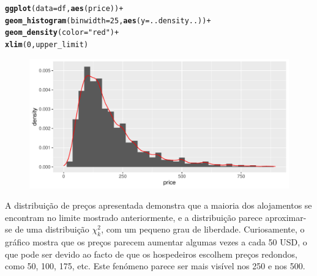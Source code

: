 \documentclass[justified, 11pt]{scrartcl}\usepackage[]{graphicx}\usepackage[]{xcolor}
\makeatletter
\def\maxwidth{ %
  \ifdim\Gin@nat@width>\linewidth
    \linewidth
  \else
    \Gin@nat@width
  \fi
}
\newcommand{\hlnum}[1]{\textcolor[rgb]{0.686,0.059,0.569}{#1}}%
\newcommand{\hlstr}[1]{\textcolor[rgb]{0.192,0.494,0.8}{#1}}%
\newcommand{\hlopt}[1]{\textcolor[rgb]{0,0,0}{#1}}%
\newcommand{\hlstd}[1]{\textcolor[rgb]{0.345,0.345,0.345}{#1}}%
\newcommand{\hlkwc}[1]{\textcolor[rgb]{0.333,0.667,0.333}{#1}}%
\newcommand{\hlkwd}[1]{\textcolor[rgb]{0.737,0.353,0.396}{\textbf{#1}}}%
\newenvironment{kframe}{%
 \def\at@end@of@kframe{}%
 \ifinner\ifhmode%
  \def\at@end@of@kframe{\end{minipage}}%
  \begin{minipage}{\columnwidth}%
 \fi\fi%
 \def\FrameCommand##1{\hskip\@totalleftmargin \hskip-\fboxsep
 \colorbox{shadecolor}{##1}\hskip-\fboxsep
     \hskip-\linewidth \hskip-\@totalleftmargin \hskip\columnwidth}%
 \MakeFramed {\advance\hsize-\width
   \@totalleftmargin\z@ \linewidth\hsize
   \@setminipage}}%
 {\par\unskip\endMakeFramed%
 \at@end@of@kframe}
\newenvironment{knitrout}{}{} %
\makeatother
\begin{document}
\begin{knitrout}
\color{fgcolor}\begin{kframe}
\begin{alltt}
\hlkwd{ggplot}\hlstd{(}\hlkwc{data}\hlstd{=df,} \hlkwd{aes}\hlstd{(price))} \hlopt{+}
  \hlkwd{geom_histogram}\hlstd{(}\hlkwc{binwidth}\hlstd{=}\hlnum{25}\hlstd{,} \hlkwd{aes}\hlstd{(}\hlkwc{y} \hlstd{= ..density..))} \hlopt{+}
  \hlkwd{geom_density}\hlstd{(}\hlkwc{color}\hlstd{=}\hlstr{"red"}\hlstd{)} \hlopt{+}
  \hlkwd{xlim}\hlstd{(}\hlnum{0}\hlstd{, upper_limit)}
\end{alltt}
\end{kframe}\begin{figure}
\includegraphics[width=\maxwidth]{figure/chunk-priceHist-1} \end{figure}

\end{knitrout}
A distribuição de preços apresentada demonstra que a maioria dos alojamentos se encontram no limite mostrado anteriormente, e a distribuição parece aproximar-se de uma distribuição $\chi_{k}^{2}$, com um pequeno grau de liberdade. Curiosamente, o gráfico mostra que os preços parecem aumentar algumas vezes a cada 50 USD, o que pode ser devido ao facto de que os hospedeiros escolhem preços redondos, como 50, 100, 175, etc. Este fenómeno parece ser mais visível nos 250 e nos 500.\\
\end{document}
